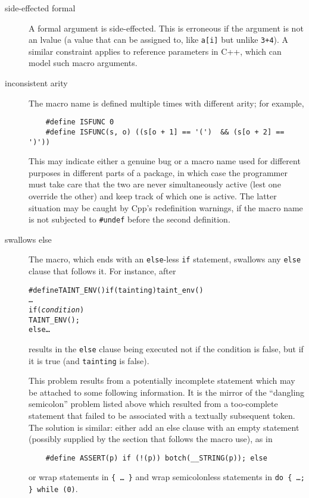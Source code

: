 \documentclass[10pt]{article}
\begin{document}
\begin{description}
\item[side-effected formal]
        A formal argument is side-effected.  This is erroneous if the
        argument is not an lvalue (a value that can be assigned to, like
        {\tt a[i]} but unlike {\tt 3+4}).  A similar constraint applies to
        reference parameters in C++, which can model such macro arguments.

\item[inconsistent arity]
        The macro name is defined multiple times with different arity; for example,
\begin{verbatim}
    #define ISFUNC 0
    #define ISFUNC(s, o) ((s[o + 1] == '(')  && (s[o + 2] == ')'))
\end{verbatim}
        This may indicate either a genuine bug or a macro name used for
        different purposes in different parts of a package, in which case
        the programmer must take care that the two are never simultaneously
        active (lest one override the other) and keep track of which one is
        active.  The latter situation may be
        caught by Cpp's redefinition warnings, if the macro name is not
        subjected to {\tt \#undef} before the second definition.

\item[swallows else]
        The macro, which ends with an {\tt else}-less {\tt if} statement,
        swallows any {\tt else} clause that follows it.  For instance, after
\begin{alltt}
    #define TAINT_ENV() if (tainting) taint_env()
    \ldots
    if ({\rm\em{}condition})
      TAINT_ENV();
    else \ldots
\end{alltt}
        results in the {\tt else} clause being executed not if  the
        condition is false, but if it is true (and {\tt tainting} is false).
        
        This problem results from a potentially incomplete statement which
        may be attached to some following information.  It is the mirror of
        the ``dangling semicolon'' problem listed above which
        resulted from a too-complete statement that failed to be
        associated with a textually subsequent token.  The solution is
        similar: either add an else clause with an empty statement
        (possibly supplied by the section that follows the macro use), as in
\begin{verbatim}
    #define ASSERT(p) if (!(p)) botch(__STRING(p)); else
\end{verbatim}
        or wrap statements in {\tt \verb|{| \ldots\ \verb|}|} and wrap
        semicolonless statements in {\tt do \verb|{| {\rm \ldots}\verb|; }| while
        (0)}.


\end{description}
\end{document}
